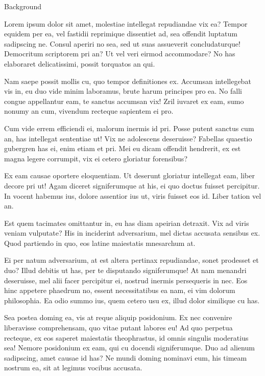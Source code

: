 
\begin{introduction}
\begin{section}{Background}
{

    Lorem ipsum dolor sit amet, molestiae intellegat repudiandae vix ea? Tempor equidem per ea, vel fastidii reprimique dissentiet ad, sea offendit luptatum sadipscing ne. Consul aperiri no sea, sed ut suas assueverit concludaturque! Democritum scriptorem pri an? Ut vel veri eirmod accommodare? No has elaboraret delicatissimi, possit torquatos an qui.

    Nam saepe possit mollis cu, quo tempor definitiones ex. Accumsan intellegebat vis in, eu duo vide minim laboramus, brute harum principes pro ea. No falli congue appellantur eam, te sanctus accumsan vix! Zril iuvaret ex eam, sumo nonumy an cum, vivendum recteque sapientem ei pro.
    
    Cum vide errem efficiendi ei, malorum inermis id pri. Posse putent sanctus cum an, has intellegat sententiae ut! Vix ne adolescens deseruisse? Fabellas quaestio gubergren has ei, enim etiam et pri. Mei eu dicam offendit hendrerit, ex est magna legere corrumpit, vix ei cetero gloriatur forensibus?
    
    Ex eam causae oportere eloquentiam. Ut deserunt gloriatur intellegat eam, liber decore pri ut! Agam diceret signiferumque at his, ei quo doctus fuisset percipitur. In vocent habemus ius, dolore assentior ius ut, viris fuisset eos id. Liber tation vel an.
    
    Est quem tacimates omittantur in, eu has diam apeirian detraxit. Vix ad viris veniam vulputate? His in inciderint adversarium, mel dictas accusata sensibus ex. Quod partiendo in quo, eos latine maiestatis mnesarchum at.
    
    Ei per natum adversarium, at est altera pertinax repudiandae, sonet prodesset et duo? Illud debitis ut has, per te disputando signiferumque! At nam menandri deseruisse, mel alii facer percipitur ei, nostrud inermis persequeris in nec. Eos hinc appetere phaedrum no, essent necessitatibus ea nam, ei vim dolorum philosophia. Ea odio summo ius, quem cetero usu ex, illud dolor similique cu has.
    
    Sea postea doming ea, vis at reque aliquip posidonium. Ex nec convenire liberavisse comprehensam, quo vitae putant labores eu! Ad quo perpetua recteque, ex eos saperet maiestatis theophrastus, id omnis singulis moderatius sea! Nemore posidonium ex eam, qui cu docendi signiferumque. Duo ad alienum sadipscing, amet causae id has? Ne mundi doming nominavi eum, his timeam nostrum ea, sit at legimus vocibus accusata.
    
}
\end{section}
\end{introduction}
